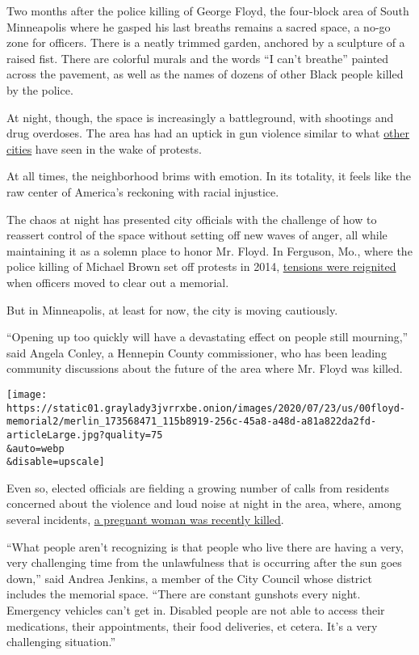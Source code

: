 Two months after the police killing of George Floyd, the four-block area
of South Minneapolis where he gasped his last breaths remains a sacred
space, a no-go zone for officers. There is a neatly trimmed garden,
anchored by a sculpture of a raised fist. There are colorful murals and
the words ``I can't breathe'' painted across the pavement, as well as
the names of dozens of other Black people killed by the police.

At night, though, the space is increasingly a battleground, with
shootings and drug overdoses. The area has had an uptick in gun violence
similar to what
\href{https://www.nytimes3xbfgragh.onion/2020/07/05/us/chicago-shootings.html}{other}
\href{https://www.nytimes3xbfgragh.onion/2020/06/23/nyregion/nyc-shootings-surge.html}{cities}
have seen in the wake of protests.

At all times, the neighborhood brims with emotion. In its totality, it
feels like the raw center of America's reckoning with racial injustice.

The chaos at night has presented city officials with the challenge of
how to reassert control of the space without setting off new waves of
anger, all while maintaining it as a solemn place to honor Mr. Floyd. In
Ferguson, Mo., where the police killing of Michael Brown set off
protests in 2014,
\href{https://www.theguardian.com/us-news/2014/dec/26/ferguson-michael-brown-memorial-destroyed}{tensions
were reignited} when officers moved to clear out a memorial.

But in Minneapolis, at least for now, the city is moving cautiously.

``Opening up too quickly will have a devastating effect on people still
mourning,'' said Angela Conley, a Hennepin County commissioner, who has
been leading community discussions about the future of the area where
Mr. Floyd was killed.

\texttt{[image: https://static01.graylady3jvrrxbe.onion/images/2020/07/23/us/00floyd-memorial2/merlin\_173568471\_115b8919-256c-45a8-a48d-a81a822da2fd-articleLarge.jpg?quality=75\\\&auto=webp\\\&disable=upscale]}

Even so, elected officials are fielding a growing number of calls from
residents concerned about the violence and loud noise at night in the
area, where, among several incidents,
\href{https://www.startribune.com/pregnant-woman-fatally-shot-in-south-minneapolis-baby-delivered/571641972/}{a
pregnant woman was recently killed}.

``What people aren't recognizing is that people who live there are
having a very, very challenging time from the unlawfulness that is
occurring after the sun goes down,'' said Andrea Jenkins, a member of
the City Council whose district includes the memorial space. ``There are
constant gunshots every night. Emergency vehicles can't get in. Disabled
people are not able to access their medications, their appointments,
their food deliveries, et cetera. It's a very challenging situation.''

